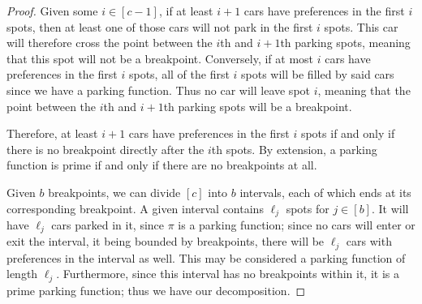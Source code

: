 \documentclass[12 pt]{amsart}
\theoremstyle{definition} %
\theoremstyle{remark} %
\begin{document}
\begin{proof}
    Given some $i\in[c-1]$, if at least $i+1$ cars have preferences in the first $i$ spots, then at least one of those cars will not park in the first $i$ spots. This car will therefore cross the point between the $i$th and $i+1$th parking spots, meaning that this spot will not be a breakpoint. Conversely, if at most $i$ cars have preferences in the first $i$ spots, all of the first $i$ spots will be filled by said cars since we have a parking function. Thus no car will leave spot $i$, meaning that the point between the $i$th and $i+1$th parking spots will be a breakpoint.

    Therefore, at least $i+1$ cars have preferences in the first $i$ spots if and only if there is no breakpoint directly after the $i$th spots. By extension, a parking function is prime if and only if there are no breakpoints at all.

    Given $b$ breakpoints, we can divide $[c]$ into $b$ intervals, each of which ends at its corresponding breakpoint. A given interval contains $\ell_j$ spots for $j\in[b]$. It will have $\ell_j$ cars parked in it, since $\pi$ is a parking function; since no cars will enter or exit the interval, it being bounded by breakpoints, there will be $\ell_j$ cars with preferences in the interval as well. This may be considered a parking function of length $\ell_j$. Furthermore, since this interval has no breakpoints within it, it is a prime parking function; thus we have our decomposition.
\end{proof}

\primecount*
\end{document}
